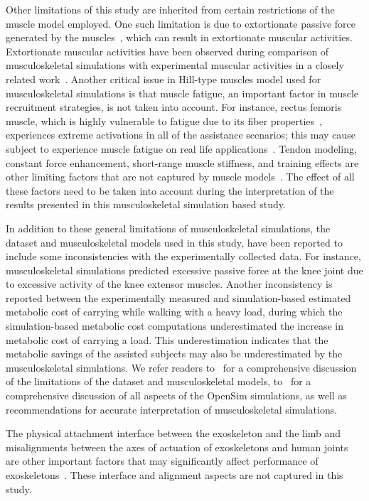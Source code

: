 \documentclass[10pt,letterpaper]{article}
\begin{document}
Other limitations of this study are inherited from certain restrictions of the muscle model employed. One such limitation is due to extortionate passive force generated by the muscles~\cite{Hicks2015,Dembia2017}, which can result in extortionate muscular activities.  Extortionate muscular activities have been observed during comparison of musculoskeletal simulations with experimental muscular activities in a closely related work~\cite{Dembia2017}.  Another critical issue in Hill-type muscles model used for musculoskeletal simulations is that  muscle fatigue, an important factor in muscle recruitment strategies, is not taken into account. For instance, rectus femoris muscle, which is highly vulnerable to fatigue due to its fiber properties~\cite{Johnson1973}, experiences extreme activations in all of the assistance scenarios; this may cause subject to experience muscle fatigue on real life applications~\cite{Newham1983}. Tendon modeling, constant force enhancement, short-range muscle stiffness, and training effects are other limiting factors that are not captured by muscle models~\cite{Hicks2015}. The effect of all these factors need to be taken into account during the interpretation of the results presented in this musculoskeletal simulation based study.

In addition to these general limitations of musculoskeletal simulations, the dataset and musculoskeletal models used in this study, have been reported to include some inconsistencies with the experimentally collected data. For instance, musculoskeletal simulations predicted excessive passive force at the knee joint due to excessive activity of the knee extensor muscles. Another inconsistency is reported between the experimentally measured and simulation-based estimated metabolic cost of carrying while walking with a heavy load, during which the simulation-based metabolic cost computations underestimated the increase in metabolic cost of carrying a load. This underestimation indicates that the metabolic savings of the assisted subjects may also be underestimated by the musculoskeletal simulations. We refer readers to~\cite{Dembia2017} for a comprehensive discussion of the limitations of the dataset and musculoskeletal models,  to~\cite{Hicks2015} for a comprehensive discussion of all aspects of the OpenSim simulations, as well as recommendations for accurate interpretation of musculoskeletal simulations.

The physical attachment interface between the exoskeleton and the limb and misalignments between the  axes of actuation of exoskeletons and human joints are other important factors that may significantly affect performance of exoskeletons~\cite{Cenciarini2011}. These interface and alignment aspects are not  captured in this study.
\end{document}
